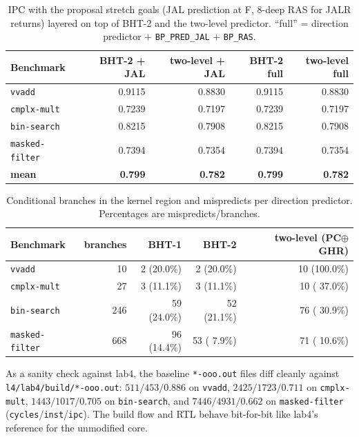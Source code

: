 \documentclass[10pt]{article}
\begin{document}
\begin{table}[h]
\centering
\caption{IPC with the proposal stretch goals (JAL prediction at F,
8-deep RAS for JALR returns) layered on top of BHT-2 and the
two-level predictor. ``full'' = direction predictor + \texttt{BP\_PRED\_JAL}
+ \texttt{BP\_RAS}.}
\label{tab:ipc_full}
\begin{tabular}{lrrrr}
\toprule
Benchmark & BHT-2 + JAL & two-level + JAL & BHT-2 full & two-level full \\
\midrule
\texttt{vvadd}        & 0.9115 & 0.8830 & 0.9115 & 0.8830 \\
\texttt{cmplx-mult}   & 0.7239 & 0.7197 & 0.7239 & 0.7197 \\
\texttt{bin-search}   & 0.8215 & 0.7908 & 0.8215 & 0.7908 \\
\texttt{masked-filter}& 0.7394 & 0.7354 & 0.7394 & 0.7354 \\
\midrule
\textbf{mean}         & \textbf{0.799} & \textbf{0.782} & \textbf{0.799} & \textbf{0.782} \\
\bottomrule
\end{tabular}
\end{table}

\begin{table}[h]
\centering
\caption{Conditional branches in the kernel region and mispredicts
per direction predictor. Percentages are mispredicts/branches.}
\label{tab:misp}
\begin{tabular}{lrrrr}
\toprule
Benchmark & branches & BHT-1 & BHT-2 & two-level (PC$\oplus$GHR) \\
\midrule
\texttt{vvadd}         &   10 &   2 (20.0\%) &   2 (20.0\%) &  10 (100.0\%) \\
\texttt{cmplx-mult}    &   27 &   3 (11.1\%) &   3 (11.1\%) &  10 ( 37.0\%) \\
\texttt{bin-search}    &  246 &  59 (24.0\%) &  52 (21.1\%) &  76 ( 30.9\%) \\
\texttt{masked-filter} &  668 &  96 (14.4\%) &  53 ( 7.9\%) &  71 ( 10.6\%) \\
\bottomrule
\end{tabular}
\end{table}

As a sanity check against lab4, the baseline \texttt{*-ooo.out} files
diff cleanly against \texttt{l4/lab4/build/*-ooo.out}: $511/453/0.886$
on \texttt{vvadd}, $2425/1723/0.711$ on \texttt{cmplx-mult},
$1443/1017/0.705$ on \texttt{bin-search}, and $7446/4931/0.662$ on
\texttt{masked-filter} (\texttt{cycles}/\texttt{inst}/\texttt{ipc}).
The build flow and RTL behave bit-for-bit like lab4's reference for
the unmodified core.
\end{document}
